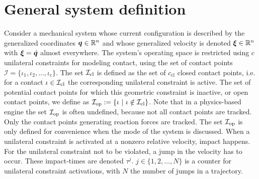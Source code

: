 \documentclass[../DC2017114Bouma.tex]{subfiles}
\begin{document}
\section{General system definition}
Consider a mechanical system whose current configuration is described by the generalized coordinates ${\boldsymbol{q}}\in\mathbb{R}^n$ and whose generalized velocity is denoted $\boldsymbol{\xi}\in\mathbb{R}^n$ with $\boldsymbol{\xi}=\dot{{\boldsymbol{q}}}$ almost everywhere. The system's operating space is restricted using $c$ unilateral constraints for modeling contact, using the set of contact points $\mathcal{I}=\{\iota_1,\iota_2,...,\iota_c\}$. The set $\mathcal{I}_{\text{cl}}$ is defined as the set of $c_{\text{cl}}$ closed contact points, i.e. for a contact $\iota\in\mathcal{I}_{\text{cl}}$ the corresponding unilateral constraint is active. The set of potential contact points for which this geometric constraint is inactive, or open contact points, we define as $\Ic_{\text{op}} := \{\iota\ |\ \iota\notin\Ic_{\text{cl}}\}$. Note that in a physics-based engine the set $\mathcal{I}_{\text{op}}$ is often undefined, because not all contact points are tracked. Only the contact points generating reaction forces are tracked. The set $\mathcal{I}_{\text{op}}$ is only defined for convenience when the mode of the system is discussed. When a unilateral constraint is activated at a nonzero relative velocity, impact happens. For the unilateral constraint not to be violated, a jump in the velocity has to occur. These impact-times are denoted $\tau^j$. $j\in \{1,2,\dots,N\}$ is a counter for unilateral constraint activations, with $N$ the number of jumps in a trajectory.
\end{document}
